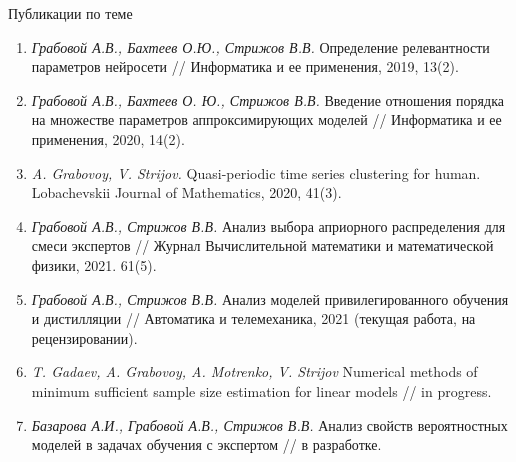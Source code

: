 \documentclass[10pt,pdf,hyperref={unicode}]{beamer}
\begin{document}
\begin{frame}{Публикации по теме}
\justifying
\begin{enumerate}
\item \textit{Грабовой А.В., Бахтеев О.Ю., Стрижов В.В.} Определение релевантности параметров нейросети // Информатика и ее применения, 2019, 13(2).
\item \textit{Грабовой А.В., Бахтеев О. Ю., Стрижов В.В.} Введение отношения порядка на множестве параметров аппроксимирующих моделей // Информатика и ее применения, 2020, 14(2).
\item \textit{A. Grabovoy, V. Strijov.} Quasi-periodic time series clustering for human. Lobachevskii Journal of Mathematics, 2020, 41(3).
\item \textit{Грабовой А.В., Стрижов В.В.} Анализ выбора априорного распределения для смеси экспертов // Журнал Вычислительной математики и математической физики, 2021. 61(5).
\item \textit{Грабовой А.В., Стрижов В.В.} Анализ моделей привилегированного обучения и дистилляции // Автоматика и телемеханика, 2021 (текущая работа, на рецензировании).
\item \textit{T. Gadaev, A. Grabovoy, A. Motrenko, V. Strijov} Numerical methods of minimum sufficient sample size estimation for linear models // in progress.
\item \textit{Базарова А.И., Грабовой А.В., Стрижов В.В.} Анализ свойств вероятностных моделей в задачах обучения с экспертом // в разработке.
\end{enumerate}

\end{frame}
\end{document}
